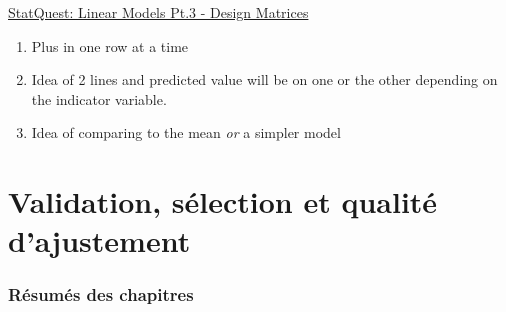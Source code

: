 \documentclass[12pt, titlepage, french]{report}
\begin{document}
\begin{YTB_SUMM}{\href{https://www.youtube.com/watch?v=CqLGvwi-5Pc&list=PLblh5JKOoLUIzaEkCLIUxQFjPIlapw8nU&index=7}{StatQuest: Linear Models Pt.3 - Design Matrices}}
\begin{enumerate}
	\item	Plus in one row at a time
	\item	Idea of 2 lines and predicted value will be on one or the other depending on the indicator variable.
	\item	Idea of comparing to the mean \textit{or} a simpler model
\end{enumerate}
\end{YTB_SUMM}

\section{Validation, sélection et qualité d'ajustement}

\subsubsection{Résumés des chapitres}
\end{document}
